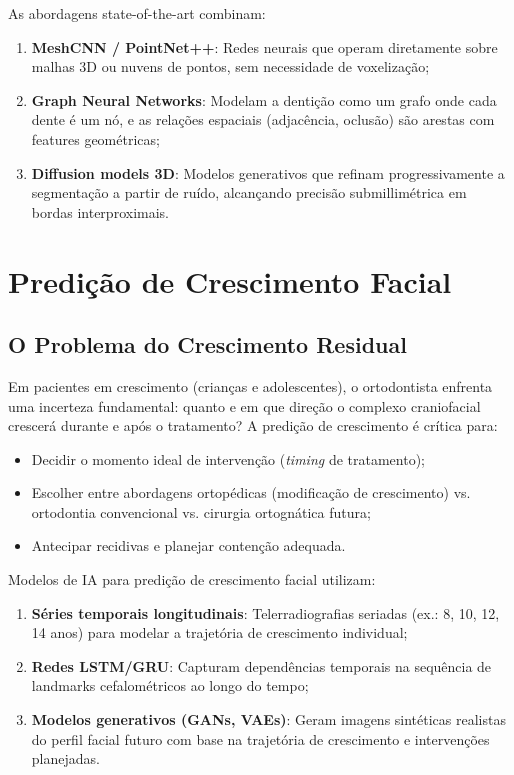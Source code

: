 As abordagens state-of-the-art combinam:
\begin{enumerate}
    \item \textbf{MeshCNN / PointNet++}: Redes neurais que operam diretamente sobre malhas 3D ou nuvens de pontos, sem necessidade de voxelização;
    \item \textbf{Graph Neural Networks}: Modelam a dentição como um grafo onde cada dente é um nó, e as relações espaciais (adjacência, oclusão) são arestas com features geométricas;
    \item \textbf{Diffusion models 3D}: Modelos generativos que refinam progressivamente a segmentação a partir de ruído, alcançando precisão submillimétrica em bordas interproximais.
\end{enumerate}

\section{Predição de Crescimento Facial}

\subsection{O Problema do Crescimento Residual}

Em pacientes em crescimento (crianças e adolescentes), o ortodontista enfrenta uma incerteza fundamental: quanto e em que direção o complexo craniofacial crescerá durante e após o tratamento? A predição de crescimento é crítica para:
\begin{itemize}
    \item Decidir o momento ideal de intervenção (\textit{timing} de tratamento);
    \item Escolher entre abordagens ortopédicas (modificação de crescimento) vs. ortodontia convencional vs. cirurgia ortognática futura;
    \item Antecipar recidivas e planejar contenção adequada.
\end{itemize}

Modelos de IA para predição de crescimento facial utilizam:
\begin{enumerate}
    \item \textbf{Séries temporais longitudinais}: Telerradiografias seriadas (ex.: 8, 10, 12, 14 anos) para modelar a trajetória de crescimento individual;
    \item \textbf{Redes LSTM/GRU}: Capturam dependências temporais na sequência de landmarks cefalométricos ao longo do tempo;
    \item \textbf{Modelos generativos (GANs, VAEs)}: Geram imagens sintéticas realistas do perfil facial futuro com base na trajetória de crescimento e intervenções planejadas.
\end{enumerate}

